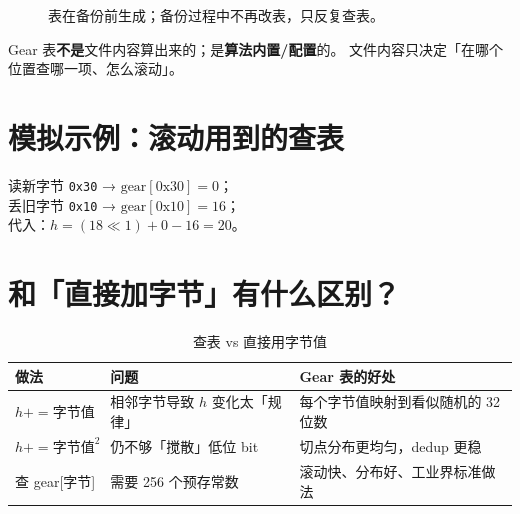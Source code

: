 \begin{figure}[htbp]
\centering
{}
\caption{表在备份前生成；备份过程中不再改表，只反复查表。}
\end{figure}

\begin{warnbox}[小白易错点]
Gear 表\textbf{不是}文件内容算出来的；是\textbf{算法内置/配置}的。  
文件内容只决定「在哪个位置查哪一项、怎么滚动」。
\end{warnbox}

\section{模拟示例：滚动用到的查表}

\begin{simbox}[$i=2$ 时滚动一次需要查两次表]
读新字节 \texttt{0x30} → $\mathrm{gear[0x30]}=0$；\\
丢旧字节 \texttt{0x10} → $\mathrm{gear[0x10]}=16$；\\
代入：$h = (18 \ll 1) + 0 - 16 = 20$。
\end{simbox}

\section{和「直接加字节」有什么区别？}

\begin{table}[htbp]
\centering
\caption{查表 vs 直接用字节值}
\small
\begin{tabular}{@{}p{3.2cm}p{5.2cm}p{5.2cm}@{}}
\toprule
\textbf{做法} & \textbf{问题} & \textbf{Gear 表的好处} \\
\midrule
$h += \text{字节值}$ & 相邻字节导致 $h$ 变化太「规律」 & 每个字节值映射到看似随机的 32 位数 \\
$h += \text{字节值}^2$ & 仍不够「搅散」低位 bit & 切点分布更均匀，dedup 更稳 \\
查 gear{[字节]} & 需要 256 个预存常数 & 滚动快、分布好、工业界标准做法 \\
\bottomrule
\end{tabular}
\end{table}
